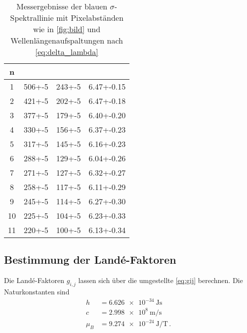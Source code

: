 \begin{table}[h]
    \centering
    \caption{Messergebnisse der blauen $\sigma$-Spektrallinie mit Pixelabständen wie in \autoref{fig:bild} und Wellenlängenaufspaltungen nach \autoref{eq:delta_lambda}}
    \label{tab:blau_sigma}
    \begin{tabular}{S[table-format=1.0] S[table-format=3.0(1)] S[table-format=3.0(1)] S[table-format=1.2(3)]}
        \toprule
        n &  & & \tableSI{\delta \lambda}{\pico\meter}  \\
         & 506+-5 & 243+-5 & 6.47+-0.15 \\
        2 & 421+-5 & 202+-5 & 6.47+-0.18 \\
        3 & 377+-5 & 179+-5 & 6.40+-0.20 \\
        4 & 330+-5 & 156+-5 & 6.37+-0.23 \\
        5 & 317+-5 & 145+-5 & 6.16+-0.23 \\
        6 & 288+-5 & 129+-5 & 6.04+-0.26 \\
        7 & 271+-5 & 127+-5 & 6.32+-0.27 \\
        8 & 258+-5 & 117+-5 & 6.11+-0.29 \\
        9 & 245+-5 & 114+-5 & 6.27+-0.30 \\
        10 & 225+-5 & 104+-5 & 6.23+-0.33 \\
        11 & 220+-5 & 100+-5 & 6.13+-0.34 \\
        \bottomrule
    \end{tabular}
\end{table}

\subsection{Bestimmung der Landé-Faktoren}
\label{ssec:Bestimmung der Lande-Faktoren}

Die Landé-Faktoren $g_{i,j}$ lassen sich über die umgestellte \autoref{eq:gij} berechnen.
Die Naturkonstanten sind 
\begin{align*}
    h &= \SI{6.626e-34}{\joule\second} \\
    c &= \SI{2.998e8}{\meter\per\second} \\
    \mu_B &= \SI{9.274e-24}{\joule\per\tesla} \, .
\end{align*}

